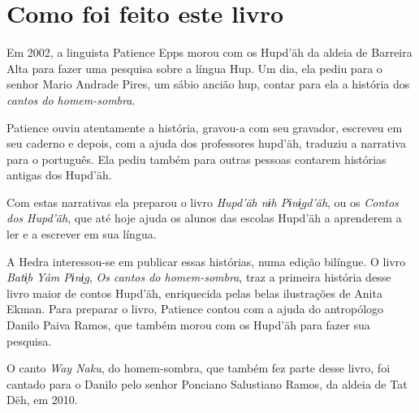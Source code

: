 \chapter{Como foi feito este livro}

Em 2002, a linguista Patience Epps morou com os Hupd’äh da aldeia de Barreira Alta para fazer uma pesquisa sobre a língua Hup. Um dia, ela pediu para o senhor Mario Andrade Pires, um sábio ancião hup, contar para ela a história dos \textit{cantos do homem-sombra}.

Patience ouviu atentamente a história, gravou-a com seu gravador, escreveu em seu caderno e depois, com a ajuda dos professores hupd’äh, traduziu a narrativa para o português. Ela pediu também para outras pessoas contarem histórias antigas dos Hupd’äh.

Com estas narrativas ela preparou o livro \textit{Hupd’äh nɨh Pɨnɨ̗gd’äh}, ou os \textit{Contos dos Hupd’äh}, que até hoje ajuda os alunos das escolas Hupd’äh a aprenderem a ler e a escrever em sua língua.

A Hedra interessou-se em publicar essas histórias, numa edição bilíngue. O livro \textit{Batɨ̗b  Yám Pɨnɨ̗g}, \textit{Os cantos do homem-sombra}, traz a primeira história desse livro maior de contos Hupd’äh, enriquecida pelas belas ilustrações de Anita Ekman. Para preparar o livro, Patience contou com a ajuda do antropólogo Danilo Paiva Ramos, que também morou com os Hupd’äh para fazer sua pesquisa.

O canto \textit{Way Naku}, do homem-sombra, que também fez parte desse livro, foi cantado
para o Danilo pelo senhor Ponciano Salustiano Ramos, da aldeia de Tat Dëh, em 2010.


